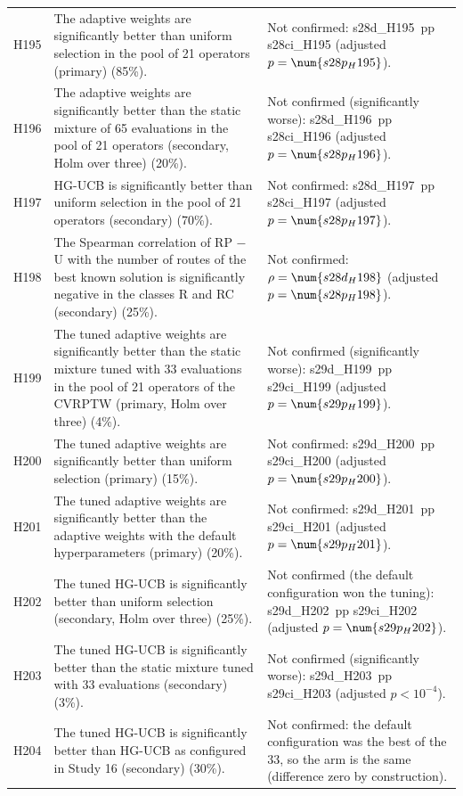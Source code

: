 \begin{center}
\begin{longtable}{>{\raggedright\arraybackslash}p{0.9cm}>{\raggedright\arraybackslash}p{5.2cm}>{\raggedright\arraybackslash}p{8.5cm}}
H195 & The adaptive weights are significantly better than uniform selection in the pool of 21 operators (primary) (85\%). & Not confirmed: \num{s28d_H195}~pp \num{s28ci_H195} (adjusted $p=\num{s28p_H195}$). \\
H196 & The adaptive weights are significantly better than the static mixture of 65 evaluations in the pool of 21 operators (secondary, Holm over three) (20\%). & Not confirmed (significantly worse): \num{s28d_H196}~pp \num{s28ci_H196} (adjusted $p=\num{s28p_H196}$). \\
H197 & HG-UCB is significantly better than uniform selection in the pool of 21 operators (secondary) (70\%). & Not confirmed: \num{s28d_H197}~pp \num{s28ci_H197} (adjusted $p=\num{s28p_H197}$). \\
H198 & The Spearman correlation of RP $-$ U with the number of routes of the best known solution is significantly negative in the classes R and RC (secondary) (25\%). & Not confirmed: $\rho=\num{s28d_H198}$ (adjusted $p=\num{s28p_H198}$). \\
H199 & The tuned adaptive weights are significantly better than the static mixture tuned with 33 evaluations in the pool of 21 operators of the CVRPTW (primary, Holm over three) (4\%). & Not confirmed (significantly worse): \num{s29d_H199}~pp \num{s29ci_H199} (adjusted $p=\num{s29p_H199}$). \\
H200 & The tuned adaptive weights are significantly better than uniform selection (primary) (15\%). & Not confirmed: \num{s29d_H200}~pp \num{s29ci_H200} (adjusted $p=\num{s29p_H200}$). \\
H201 & The tuned adaptive weights are significantly better than the adaptive weights with the default hyperparameters (primary) (20\%). & Not confirmed: \num{s29d_H201}~pp \num{s29ci_H201} (adjusted $p=\num{s29p_H201}$). \\
H202 & The tuned HG-UCB is significantly better than uniform selection (secondary, Holm over three) (25\%). & Not confirmed (the default configuration won the tuning): \num{s29d_H202}~pp \num{s29ci_H202} (adjusted $p=\num{s29p_H202}$). \\
H203 & The tuned HG-UCB is significantly better than the static mixture tuned with 33 evaluations (secondary) (3\%). & Not confirmed (significantly worse): \num{s29d_H203}~pp \num{s29ci_H203} (adjusted $p<10^{-4}$). \\
H204 & The tuned HG-UCB is significantly better than HG-UCB as configured in Study 16 (secondary) (30\%). & Not confirmed: the default configuration was the best of the 33, so the arm is the same (difference zero by construction). \\
\end{longtable}
\end{center}
